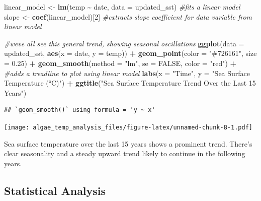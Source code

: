 \documentclass[
]{article}
\newenvironment{Shaded}{\begin{snugshade}}{\end{snugshade}}
\newcommand{\AttributeTok}[1]{\textcolor[rgb]{0.13,0.29,0.53}{#1}}
\newcommand{\CommentTok}[1]{\textcolor[rgb]{0.56,0.35,0.01}{\textit{#1}}}
\newcommand{\ConstantTok}[1]{\textcolor[rgb]{0.56,0.35,0.01}{#1}}
\newcommand{\DecValTok}[1]{\textcolor[rgb]{0.00,0.00,0.81}{#1}}
\newcommand{\FloatTok}[1]{\textcolor[rgb]{0.00,0.00,0.81}{#1}}
\newcommand{\FunctionTok}[1]{\textcolor[rgb]{0.13,0.29,0.53}{\textbf{#1}}}
\newcommand{\NormalTok}[1]{#1}
\newcommand{\OtherTok}[1]{\textcolor[rgb]{0.56,0.35,0.01}{#1}}
\newcommand{\SpecialCharTok}[1]{\textcolor[rgb]{0.81,0.36,0.00}{\textbf{#1}}}
\newcommand{\StringTok}[1]{\textcolor[rgb]{0.31,0.60,0.02}{#1}}
\begin{document}
\begin{Shaded}
\begin{Highlighting}[]
\NormalTok{linear\_model }\OtherTok{\textless{}{-}} \FunctionTok{lm}\NormalTok{(temp }\SpecialCharTok{\textasciitilde{}}\NormalTok{ date, }\AttributeTok{data =}\NormalTok{ updated\_sst) }\CommentTok{\#fits a linear model}
\NormalTok{slope }\OtherTok{\textless{}{-}} \FunctionTok{coef}\NormalTok{(linear\_model)[}\DecValTok{2}\NormalTok{] }\CommentTok{\#extracts slope coefficient for data variable from linear model }

\CommentTok{\#we\textquotesingle{}ve all see this general trend, showing seasonal oscillations}
\FunctionTok{ggplot}\NormalTok{(}\AttributeTok{data =}\NormalTok{ updated\_sst, }\FunctionTok{aes}\NormalTok{(}\AttributeTok{x =}\NormalTok{ date, }\AttributeTok{y =}\NormalTok{ temp)) }\SpecialCharTok{+}
  \FunctionTok{geom\_point}\NormalTok{(}\AttributeTok{color =} \StringTok{"\#726161"}\NormalTok{, }\AttributeTok{size =} \FloatTok{0.25}\NormalTok{) }\SpecialCharTok{+}
  \FunctionTok{geom\_smooth}\NormalTok{(}\AttributeTok{method =} \StringTok{"lm"}\NormalTok{, }\AttributeTok{se =} \ConstantTok{FALSE}\NormalTok{, }\AttributeTok{color =} \StringTok{"red"}\NormalTok{) }\SpecialCharTok{+} \CommentTok{\#adds a treadline to plot using linear model }
  \FunctionTok{labs}\NormalTok{(}\AttributeTok{x =} \StringTok{"Time"}\NormalTok{, }
       \AttributeTok{y =} \StringTok{"Sea Surface Temperature (°C)"}\NormalTok{) }\SpecialCharTok{+} 
  \FunctionTok{ggtitle}\NormalTok{(}\StringTok{"Sea Surface Temperature Trend Over the Last 15 Years"}\NormalTok{)}
\end{Highlighting}
\end{Shaded}

\begin{verbatim}
## `geom_smooth()` using formula = 'y ~ x'
\end{verbatim}

\texttt{[image: algae\_temp\_analysis\_files/figure-latex/unnamed-chunk-8-1.pdf]}

Sea surface temperature over the last 15 years shows a prominent trend.
There's clear seasonality and a steady upward trend likely to continue
in the following years.

\hypertarget{statistical-analysis}{%
\subsection{Statistical Analysis}\label{statistical-analysis}}
\end{document}
